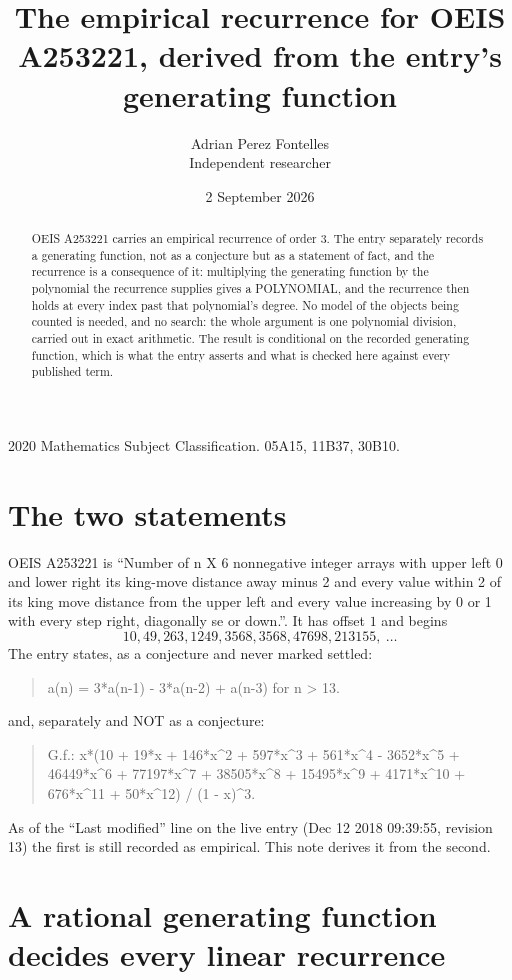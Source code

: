 \documentclass[11pt,a4paper]{article}
\title{The empirical recurrence for OEIS A253221, derived from the entry's generating function}
\author{Adrian Perez Fontelles\\ \small Independent researcher}
\date{2 September 2026}
\theoremstyle{plain}
\theoremstyle{definition}
\begin{document}
\maketitle

\begin{abstract}
OEIS A253221 carries an empirical recurrence of order $3$. The entry separately records a
generating function, not as a conjecture but as a statement of fact, and the recurrence is a
consequence of it: multiplying the generating function by the polynomial the recurrence
supplies gives a POLYNOMIAL, and the recurrence then holds at every index past that
polynomial's degree. No model of the objects being counted is needed, and no search: the
whole argument is one polynomial division, carried out in exact arithmetic. The result is
conditional on the recorded generating function, which is what the entry asserts and what is
checked here against every published term.
\end{abstract}

\noindent\small 2020 Mathematics Subject Classification. 05A15, 11B37, 30B10.\normalsize

\section{The two statements}

OEIS A253221 is ``Number of n X 6 nonnegative integer arrays with upper left 0 and lower right its king-move distance away minus 2 and every value within 2 of its king move distance from the upper left and every value increasing by 0 or 1 with every step right, diagonally se or down.''. It has offset $1$ and begins
\[
10, 49, 263, 1249, 3568, 3568, 47698, 213155,\ \dots
\]
The entry states, as a conjecture and never marked settled:
\begin{quote}
a(n) = 3*a(n-1) - 3*a(n-2) + a(n-3) for n > 13.
\end{quote}
and, separately and NOT as a conjecture:
\begin{quote}
G.f.: x*(10 + 19*x + 146*x\^{}2 + 597*x\^{}3 + 561*x\^{}4 - 3652*x\^{}5 + 46449*x\^{}6 + 77197*x\^{}7 + 38505*x\^{}8 + 15495*x\^{}9 + 4171*x\^{}10 + 676*x\^{}11 + 50*x\^{}12) / (1 - x)\^{}3.
\end{quote}
As of the ``Last modified'' line on the live entry (Dec 12 2018 09:39:55, revision 13) the first is still
recorded as empirical. This note derives it from the second.

\section{A rational generating function decides every linear recurrence}
\end{document}

